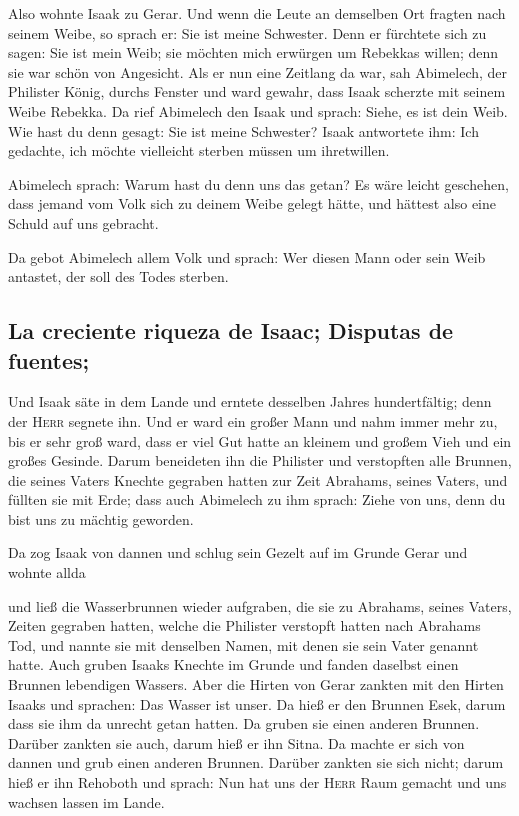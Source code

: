  Also wohnte Isaak zu Gerar.  Und wenn die
Leute an demselben Ort fragten nach seinem Weibe, so sprach er: Sie ist
meine Schwester. Denn er fürchtete sich zu sagen: Sie ist mein Weib; sie
möchten mich erwürgen um Rebekkas willen; denn sie war schön von
Angesicht.  Als er nun eine Zeitlang da war, sah
Abimelech, der Philister König, durchs Fenster und ward gewahr, dass
Isaak scherzte mit seinem Weibe Rebekka.  Da rief
Abimelech den Isaak und sprach: Siehe, es ist dein Weib. Wie hast du
denn gesagt: Sie ist meine Schwester? Isaak antwortete ihm: Ich
gedachte, ich möchte vielleicht sterben müssen um ihretwillen.

 Abimelech sprach: Warum hast du denn uns das getan? Es
wäre leicht geschehen, dass jemand vom Volk sich zu deinem Weibe gelegt
hätte, und hättest also eine Schuld auf uns gebracht.

 Da gebot Abimelech allem Volk und sprach: Wer diesen
Mann oder sein Weib antastet, der soll des Todes sterben.

\hypertarget{la-creciente-riqueza-de-isaac-disputas-de-fuentes}{%
\subsection{La creciente riqueza de Isaac; Disputas de
fuentes;}\label{la-creciente-riqueza-de-isaac-disputas-de-fuentes}}

 Und Isaak säte in dem Lande und erntete desselben Jahres
hundertfältig; denn der \textsc{Herr} segnete ihn.  Und
er ward ein großer Mann und nahm immer mehr zu, bis er sehr groß ward,
 dass er viel Gut hatte an kleinem und großem Vieh und
ein großes Gesinde. Darum beneideten ihn die Philister 
und verstopften alle Brunnen, die seines Vaters Knechte gegraben hatten
zur Zeit Abrahams, seines Vaters, und füllten sie mit Erde;
 dass auch Abimelech zu ihm sprach: Ziehe von uns, denn
du bist uns zu mächtig geworden.

 Da zog Isaak von dannen und schlug sein Gezelt auf im
Grunde Gerar und wohnte allda

 und ließ die Wasserbrunnen wieder aufgraben, die sie zu
Abrahams, seines Vaters, Zeiten gegraben hatten, welche die Philister
verstopft hatten nach Abrahams Tod, und nannte sie mit denselben Namen,
mit denen sie sein Vater genannt hatte.  Auch gruben
Isaaks Knechte im Grunde und fanden daselbst einen Brunnen lebendigen
Wassers.  Aber die Hirten von Gerar zankten mit den
Hirten Isaaks und sprachen: Das Wasser ist unser. Da hieß er den Brunnen
Esek, darum dass sie ihm da unrecht getan hatten.  Da
gruben sie einen anderen Brunnen. Darüber zankten sie auch, darum hieß
er ihn Sitna.  Da machte er sich von dannen und grub
einen anderen Brunnen. Darüber zankten sie sich nicht; darum hieß er ihn
Rehoboth und sprach: Nun hat uns der \textsc{Herr} Raum gemacht und uns
wachsen lassen im Lande.

